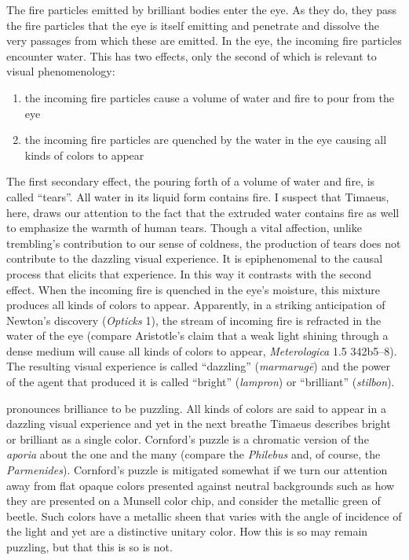 The fire particles emitted by brilliant bodies enter the eye. As they do, they pass the fire particles that the eye is itself emitting and penetrate and dissolve the very passages from which these are emitted. In the eye, the incoming fire particles encounter water. This has two effects, only the second of which is relevant to visual phenomenology:
\begin{enumerate}
	\item the incoming fire particles cause a volume of water and fire to pour from the eye
	\item the incoming fire particles are quenched by the water in the eye causing all kinds of colors to appear
\end{enumerate}
The first secondary effect, the pouring forth of a volume of water and fire, is called ``tears''. All water in its liquid form contains fire. I suspect that Timaeus, here, draws our attention to the fact that the extruded water contains fire as well to emphasize the warmth of human tears. Though a vital affection, unlike trembling's contribution to our sense of coldness, the production of tears does not contribute to the dazzling visual experience. It is epiphenomenal to the causal process that elicits that experience. In this way it contrasts with the second effect. When the incoming fire is quenched in the eye's moisture, this mixture produces all kinds of colors to appear. Apparently, in a striking anticipation of Newton's discovery (\emph{Opticks} 1), the stream of incoming fire is refracted in the water of the eye (compare Aristotle's claim that a weak light shining through a dense medium will cause all kinds of colors to appear, \emph{Meterologica} 1.5 342b5--8). The resulting visual experience is called ``dazzling'' (\emph{marmarugē}) and the power of the agent that produced it is called ``bright''  (\emph{lampron}) or ``brilliant'' (\emph{stilbon}). 

\citet[277--8]{Cornford:1935fk} pronounces brilliance to be puzzling. All kinds of colors are said to appear in a dazzling visual experience and yet in the next breathe Timaeus describes bright or brilliant as a single color. Cornford's puzzle is a chromatic version of the \emph{aporia} about the one and the many (compare the \emph{Philebus} and, of course, the \emph{Parmenides}). Cornford's puzzle is mitigated somewhat if we turn our attention away from flat opaque colors presented against neutral backgrounds such as how they are presented on a Munsell color chip, and consider the metallic green of beetle. Such colors have a metallic sheen that varies with the angle of incidence of the light and yet are a distinctive unitary color. How this is so may remain puzzling, but that this is so is not.


